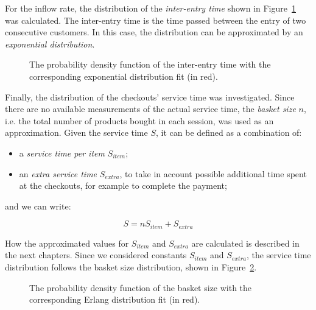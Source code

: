 For the inflow rate, the distribution of the \emph{inter-entry time} shown in Figure~\ref{fig:inter_entry_time_distribution} was calculated. The inter-entry time is the time passed between the entry of two consecutive customers. In this case, the distribution can be approximated by an \emph{exponential distribution}.

\begin{figure}
  \begin{center}
  \end{center}
  \caption{The probability density function of the inter-entry time with the corresponding exponential distribution fit (in red).}
  \label{fig:inter_entry_time_distribution}
\end{figure}

Finally, the distribution of the checkouts’ service time was investigated. Since there are no available measurements of the actual service time, the \emph{basket size} \( n \), i.e. the total number of products bought in each session, was used as an approximation. Given the service time \( S \), it can be defined as a combination of:
\begin{itemize}
  \item a \emph{service time per item} \( S_{item} \);
  \item an \emph{extra service time} \( S_{extra} \), to take in account possible additional time spent at the checkouts, for example to complete the payment;
\end{itemize}
and we can write:

\begin{equation}
  S = n S_{item} + S_{extra}
  \label{eq:service_time}
\end{equation}

How the approximated values for \( S_{item} \) and \( S_{extra} \) are calculated is described in the next chapters. Since we considered constants \( S_{item} \) and \( S_{extra} \), the service time distribution follows the basket size distribution, shown in Figure~\ref{fig:basket_size_distribution}.

\begin{figure}
  \begin{center}
  \end{center}
  \caption{The probability density function of the basket size with the corresponding Erlang distribution fit (in red).}
  \label{fig:basket_size_distribution}
\end{figure}

